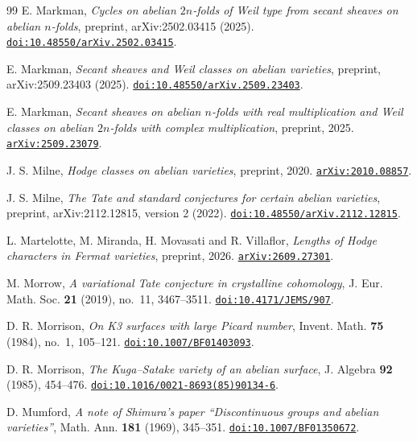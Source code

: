 \documentclass[11pt,reqno]{amsart}
\theoremstyle{plain}
\theoremstyle{definition}
\theoremstyle{remark}
\begin{document}
\begin{thebibliography}{99}
E. Markman,
\emph{Cycles on abelian $2n$-folds of Weil type from secant sheaves on abelian
$n$-folds}, preprint, arXiv:2502.03415 (2025).
\href{https://doi.org/10.48550/arXiv.2502.03415}{\texttt{doi:10.48550/arXiv.2502.03415}}.

E. Markman,
\emph{Secant sheaves and Weil classes on abelian varieties},
preprint, arXiv:2509.23403 (2025).
\href{https://doi.org/10.48550/arXiv.2509.23403}{\texttt{doi:10.48550/arXiv.2509.23403}}.

E. Markman,
\emph{Secant sheaves on abelian $n$-folds with real multiplication and Weil
classes on abelian $2n$-folds with complex multiplication},
preprint, 2025.
\href{https://arxiv.org/abs/2509.23079}{\texttt{arXiv:2509.23079}}.

J. S. Milne,
\emph{Hodge classes on abelian varieties},
preprint, 2020.
\href{https://arxiv.org/abs/2010.08857}{\texttt{arXiv:2010.08857}}.

J. S. Milne,
\emph{The Tate and standard conjectures for certain abelian varieties},
preprint, arXiv:2112.12815, version 2 (2022).
\href{https://doi.org/10.48550/arXiv.2112.12815}{\texttt{doi:10.48550/arXiv.2112.12815}}.

L. Martelotte, M. Miranda, H. Movasati and R. Villaflor,
\emph{Lengths of Hodge characters in Fermat varieties},
preprint, 2026.
\href{https://arxiv.org/abs/2609.27301}{\texttt{arXiv:2609.27301}}.

M. Morrow,
\emph{A variational Tate conjecture in crystalline cohomology},
J. Eur. Math. Soc. \textbf{21} (2019), no.~11, 3467--3511.
\href{https://doi.org/10.4171/JEMS/907}{\texttt{doi:10.4171/JEMS/907}}.

D. R. Morrison,
\emph{On K3 surfaces with large Picard number},
Invent. Math. \textbf{75} (1984), no.~1, 105--121.
\href{https://doi.org/10.1007/BF01403093}{\texttt{doi:10.1007/BF01403093}}.

D. R. Morrison,
\emph{The Kuga--Satake variety of an abelian surface},
J. Algebra \textbf{92} (1985), 454--476.
\href{https://doi.org/10.1016/0021-8693(85)90134-6}%
{\texttt{doi:10.1016/0021-8693(85)90134-6}}.

D. Mumford,
\emph{A note of Shimura's paper ``Discontinuous groups and abelian
varieties''},
Math. Ann. \textbf{181} (1969), 345--351.
\href{https://doi.org/10.1007/BF01350672}{\texttt{doi:10.1007/BF01350672}}.


\end{thebibliography}
\end{document}
